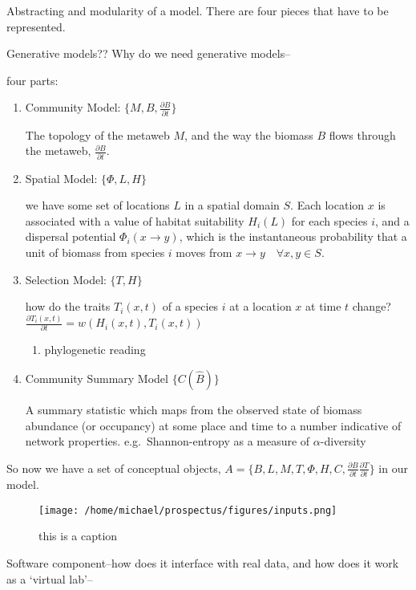 Abstracting and modularity of a model. There are four pieces that have
to be represented.

Generative models?? Why do we need generative models--

four parts:

\begin{enumerate}
\def\labelenumi{\arabic{enumi}.}
\item
  Community Model: \(\{M, B, \frac{\partial B}{\partial t}\}\)

  The topology of the metaweb \(M\), and the way the biomass \(B\) flows
  through the metaweb, \(\frac{\partial B}{\partial t}\).
\item
  Spatial Model: \(\{\Phi, L, H\}\)

  we have some set of locations \(L\) in a spatial domain \(S\). Each
  location \(x\) is associated with a value of habitat suitability
  \(H_i(L)\) for each species \(i\), and a dispersal potential
  \(\Phi_i(x \to y)\), which is the instantaneous probability that a
  unit of biomass from species \(i\) moves from
  \(x \to y \quad \forall x,y \in S\).
\item
  Selection Model: \(\{ T, H\}\)

  how do the traits \(T_i(x,t)\) of a species \(i\) at a location \(x\)
  at time \(t\) change?
  \(\frac{\partial T_i(x,t)}{\partial t} = w (H_i(x,t), T_i(x,t))\)

  \begin{enumerate}
  \def\labelenumii{\arabic{enumii}.}
  \tightlist
  \item
    phylogenetic reading
  \end{enumerate}
\item
  Community Summary Model \(\{ C(\hat{B}) \}\)

  A summary statistic which maps from the observed state of biomass
  abundance (or occupancy) at some place and time to a number indicative
  of network properties. e.g.~Shannon-entropy as a measure of
  \(\alpha\)-diversity
\end{enumerate}

So now we have a set of conceptual objects,
\(A = \{B, L, M, T, \Phi, H, C, \frac{\partial B}{\partial t} \frac{\partial T}{\partial t}\}\)
in our model.

\begin{figure}
\centering
\texttt{[image: /home/michael/prospectus/figures/inputs.png]}
\caption{this is a caption}
\end{figure}

Software component--how does it interface with real data, and how does
it work as a `virtual lab'--

